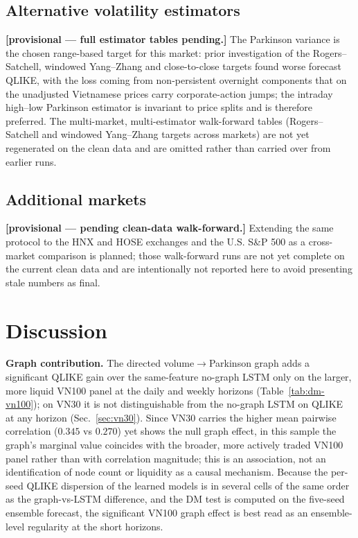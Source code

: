 \documentclass[runningheads]{llncs}
\begin{document}
\subsection{Alternative volatility estimators}\label{sec:est}
\textbf{[provisional --- full estimator tables pending.]} The Parkinson variance is the chosen
range-based target for this market: prior investigation of the Rogers--Satchell, windowed
Yang--Zhang and close-to-close targets found worse forecast QLIKE, with the loss coming from
non-persistent overnight components that on the unadjusted Vietnamese prices carry corporate-action
jumps; the intraday high--low Parkinson estimator is invariant to price splits and is therefore
preferred. The multi-market, multi-estimator walk-forward tables (Rogers--Satchell and windowed
Yang--Zhang targets across markets) are not yet regenerated on the clean data and are omitted rather
than carried over from earlier runs.

\subsection{Additional markets}
\textbf{[provisional --- pending clean-data walk-forward.]} Extending the same protocol to the HNX and
HOSE exchanges and the U.S. S\&P 500 as a cross-market comparison is planned; those walk-forward runs
are not yet complete on the current clean data and are intentionally not reported here to avoid
presenting stale numbers as final.

\FloatBarrier
\section{Discussion}\label{sec:disc}
\textbf{Graph contribution.} The directed volume$\to$Parkinson graph adds a significant QLIKE gain
over the same-feature no-graph LSTM only on the larger, more liquid VN100 panel at the daily and
weekly horizons (Table~\ref{tab:dm-vn100}); on VN30 it is not distinguishable from the no-graph LSTM
on QLIKE at any horizon (Sec.~\ref{sec:vn30}). Since VN30 carries the higher mean pairwise correlation
($0.345$ vs $0.270$) yet shows the null graph effect, in this sample the graph's marginal value
coincides with the broader, more actively traded VN100 panel rather than with correlation magnitude;
this is an association, not an identification of node count or liquidity as a causal mechanism. Because the per-seed QLIKE dispersion of the learned models is in several
cells of the same order as the graph-vs-LSTM difference, and the DM test is computed on the five-seed
ensemble forecast, the significant VN100 graph effect is best read as an ensemble-level regularity at
the short horizons.
\end{document}
